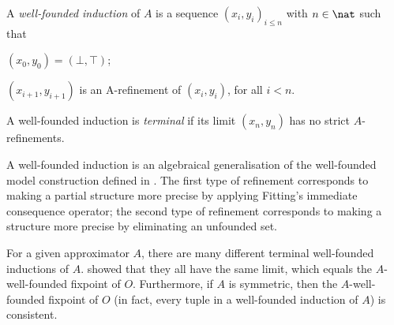  \begin{definition}
 A \emph{well-founded induction} of $A$  is a sequence 
$(x_i,y_i)_{i\leq n}$
with $n\in\nat$ such that 
\begin{compactitem}
	\item $(x_0,y_0) = (\bot,\top)$;
	\item $(x_{i+1},y_{i+1})$ is an A-refinement of $(x_{i},y_{i})$, for  all $i<n$.
\end{compactitem}
A well-founded induction is \emph{terminal} if its limit $(x_n,y_n)$ has no strict $A$-refinements.
\end{definition}
A well-founded induction is an algebraical generalisation of the well-founded model construction defined in \cite{GelderRS91}. 
The first type of refinement corresponds to making a partial structure more precise by applying Fitting's immediate consequence operator; the second type of refinement corresponds to making a structure more precise by eliminating an unfounded set. 

For a given approximator $A$, there are many different terminal well-founded inductions of $A$.
\citet{lpnmr/DeneckerV07}  showed that they all have the same limit, which equals the $A$-well-founded fixpoint of $O$. Furthermore, if $A$ is symmetric, then the $A$-well-founded fixpoint of $O$ (in fact, every tuple in a well-founded induction of $A$) is consistent. 

